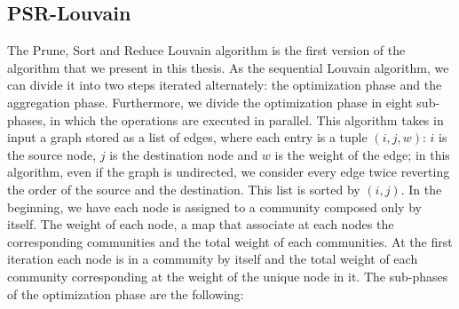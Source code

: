 \subsection{PSR-Louvain}\label{Prune-Sort-Reduce}
The Prune, Sort and Reduce Louvain algorithm is the first version of the algorithm that we present in this thesis. As the sequential Louvain algorithm, we can divide it into two steps iterated alternately: the optimization phase and the aggregation phase. 
Furthermore, we divide the optimization phase in eight sub-phases, in which the operations are executed in parallel.
This algorithm takes in input a graph stored as a list of edges, where each entry is a tuple $(i,j,w)$: $i$ is the source node, $j$ is the destination node and $w$ is the weight of the edge; in this algorithm, even if the graph is undirected, we consider every edge twice reverting the order of the source and the destination. This list is sorted by $(i,j)$. In the beginning, we have each node is assigned to a community composed only by itself.
The weight of each node, a map that associate at each nodes the corresponding communities and the total weight of each communities. At the first iteration each node is in a community by itself and the total weight of each community corresponding at the weight of the unique node in it. The sub-phases of the optimization phase are the following:\\
